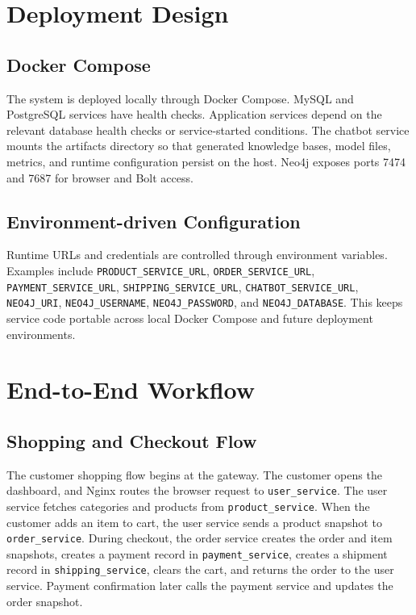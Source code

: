 \documentclass[12pt,a4paper]{article}
\begin{document}
\section{Deployment Design}

\subsection{Docker Compose}

The system is deployed locally through Docker Compose. MySQL and PostgreSQL services have health checks. Application services depend on the relevant database health checks or service-started conditions. The chatbot service mounts the artifacts directory so that generated knowledge bases, model files, metrics, and runtime configuration persist on the host. Neo4j exposes ports 7474 and 7687 for browser and Bolt access.

\subsection{Environment-driven Configuration}

Runtime URLs and credentials are controlled through environment variables. Examples include \texttt{PRODUCT\_SERVICE\_URL}, \texttt{ORDER\_SERVICE\_URL}, \texttt{PAYMENT\_SERVICE\_URL}, \texttt{SHIPPING\_SERVICE\_URL}, \texttt{CHATBOT\_SERVICE\_URL}, \texttt{NEO4J\_URI}, \texttt{NEO4J\_USERNAME}, \texttt{NEO4J\_PASSWORD}, and \texttt{NEO4J\_DATABASE}. This keeps service code portable across local Docker Compose and future deployment environments.

\section{End-to-End Workflow}

\subsection{Shopping and Checkout Flow}

The customer shopping flow begins at the gateway. The customer opens the dashboard, and Nginx routes the browser request to \texttt{user\_service}. The user service fetches categories and products from \texttt{product\_service}. When the customer adds an item to cart, the user service sends a product snapshot to \texttt{order\_service}. During checkout, the order service creates the order and item snapshots, creates a payment record in \texttt{payment\_service}, creates a shipment record in \texttt{shipping\_service}, clears the cart, and returns the order to the user service. Payment confirmation later calls the payment service and updates the order snapshot.
\end{document}

